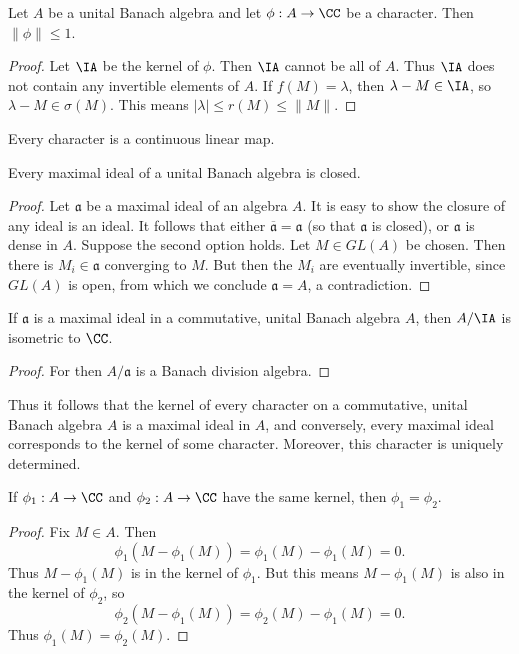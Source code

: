 \begin{lemma}
    Let $A$ be a unital Banach algebra and let $\phi: A \to \CC$ be a character. Then $\| \phi \| \leq 1$.
\end{lemma}
\begin{proof}
    Let $\IA$ be the kernel of $\phi$. Then $\IA$ cannot be all of $A$. Thus $\IA$ does not contain any invertible elements of $A$. If $f(M) = \lambda$, then $\lambda - M \in \IA$, so $\lambda - M \in \sigma(M)$. This means $|\lambda| \leq r(M) \leq \| M \|$.
\end{proof}

\begin{corollary}
    Every character is a continuous linear map.
\end{corollary}

\begin{lemma}
    Every maximal ideal of a unital Banach algebra is closed.
\end{lemma}
\begin{proof}
    Let $\mathfrak{a}$ be a maximal ideal of an algebra $A$. It is easy to show the closure of any ideal is an ideal. It follows that either $\overline{\mathfrak{a}} = \mathfrak{a}$ (so that $\mathfrak{a}$ is closed), or $\mathfrak{a}$ is dense in $A$. Suppose the second option holds. Let $M \in GL(A)$ be chosen. Then there is $M_i \in \mathfrak{a}$ converging to $M$. But then the $M_i$ are eventually invertible, since $GL(A)$ is open, from which we conclude $\mathfrak{a} = A$, a contradiction.
\end{proof}

\begin{corollary}
    If $\mathfrak{a}$ is a maximal ideal in a commutative, unital Banach algebra $A$, then $A/\IA$ is isometric to $\CC$.
\end{corollary}
\begin{proof}
    For then $A/\mathfrak{a}$ is a Banach division algebra.
\end{proof}

Thus it follows that the kernel of every character on a commutative, unital Banach algebra $A$ is a maximal ideal in $A$, and conversely, every maximal ideal corresponds to the kernel of some character. Moreover, this character is uniquely determined.

\begin{lemma}
    If $\phi_1: A \to \CC$ and $\phi_2: A \to \CC$ have the same kernel, then $\phi_1 = \phi_2$.
\end{lemma}
\begin{proof}
    Fix $M \in A$. Then
    \[ \phi_1(M - \phi_1(M)) = \phi_1(M) - \phi_1(M) = 0. \]
    Thus $M - \phi_1(M)$ is in the kernel of $\phi_1$. But this means $M - \phi_1(M)$ is also in the kernel of $\phi_2$, so
    \[ \phi_2(M - \phi_1(M)) = \phi_2(M) - \phi_1(M) = 0. \]
    Thus $\phi_1(M) = \phi_2(M)$.
\end{proof}

